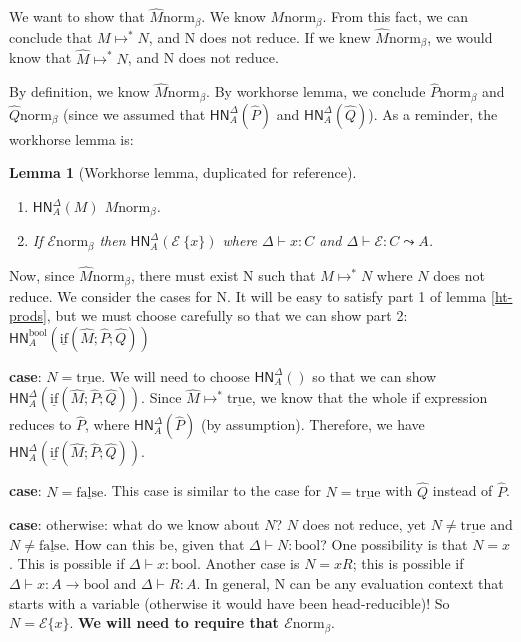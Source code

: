 \documentclass{article}
\newtheorem{lem}[thm]{Lemma}
\newcommand{\hasEF}[3]{\ensuremath{#1 \vdash #2 : #3}}
\newcommand{\bnorm}[1]{\ensuremath{#1 \mathrel{\text{norm}_\beta}}}
\newcommand{\hnorm}[3]{\ensuremath{\mathsf{HN}^{#1}_{#2}(#3)}}
\newcommand{\steps}[2]{\ensuremath{#1 \mapsto^* #2}}
\newcommand{\fn}[2]{\ensuremath{#1 \to #2}}
\newcommand{\ap}[2]{\ensuremath{#1\ #2}}
\newcommand{\booltype}{\text{bool}}
\newcommand{\E}{\mathcal{E}}
\newcommand{\true}{\ensuremath{\mathrm{\underline{true}}}}
\newcommand{\false}{\ensuremath{\mathrm{\underline{false}}}}
\newcommand{\ifexpr}[3]{\ensuremath{\mathrm{\underline{if}}(#1; #2; #3)}}
\begin{document}
We want to show that \bnorm{\hat M}. We know \bnorm{M}. From this fact, we can conclude that \steps{M}{N}, and N does not reduce. If we knew \bnorm{\hat M}, we would know that \steps{\hat M}{N}, and N does not reduce. 

By definition, we know \bnorm{\hat{M}}. By workhorse lemma, we conclude \bnorm{\hat{P}} and \bnorm{\hat{Q}} (since we assumed that \hnorm{\Delta}{A}{\hat P} and \hnorm{\Delta}{A}{\hat Q}). As a reminder, the workhorse lemma is:

\begin{lem}[Workhorse lemma, duplicated for reference]\label{lem:workhorse}
\leavevmode %
\begin{enumerate}
\item {} \hnorm{\Delta}{A}{M}  \bnorm{M}.
\item If \bnorm{\E} then \hnorm{\Delta}{A}{\ap{\E}{\{x\}}} where \hasEF{\Delta}{x}{C} and \hasEF{\Delta}{\E}{C \leadsto A}.
\end{enumerate}
\end{lem}

Now, since \bnorm{\hat{M}}, there must exist N such that \steps{M}{N} where $N$ does not reduce. We consider the cases for N. It will be easy to satisfy part 1 of lemma \ref{ht-prods}, but we must choose carefully so that we can show part 2: \hnorm{\booltype}{A}{\ifexpr{\hat M}{\hat P}{\hat Q}}

\textbf{case}: $N = \true$. We will need to choose \hnorm{\Delta}{A}{} 
so that we can show \hnorm{\Delta}{A}{\ifexpr{\hat M}{\hat P}{\hat Q}}. 
Since \steps{\hat M}{\true}, we know that the whole if expression 
reduces to $\hat{P}$, where \hnorm{\Delta}{A}{\hat P} (by assumption). Therefore, we have \hnorm{\Delta}{A}{\ifexpr{\hat M}{\hat P}{\hat Q}}.

\textbf{case}: $N = \false$. This case is similar to the case for $N = \true$ with $\hat Q$ instead of $\hat P$.

\textbf{case}: otherwise: what do we know about $N$? $N$ does not reduce, yet $N \neq \true$ and $N \neq \false$. How can this be, given that \hasEF{\Delta}{N}{\booltype}? One possibility is that $N = x$. This is possible if \hasEF{\Delta}{x}{\booltype}. Another case is $N = x R$; this is possible if \hasEF{\Delta}{x}{\fn{A}{\booltype}} and \hasEF{\Delta}{R}{A}. In general, N can be any evaluation context that starts with a variable (otherwise it would have been head-reducible)! So $N = \E \{ x \}$. \textbf{We will need to require that \bnorm{\E}}.
\end{document}
